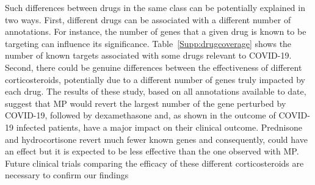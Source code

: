 \documentclass[Minh_PhD_thesis.tex]{subfiles}
\begin{document}
Such differences between drugs in the same class can be potentially explained in two ways. First, different drugs can be associated with a different number of annotations. For instance, the number of genes that a given drug is known to be targeting can influence its significance. Table~\ref{Supp:drugcoverage} shows the number of known targets associated with some drugs relevant to COVID-19. Second, there could be genuine differences between the effectiveness of different corticosteroids, potentially due to a different number of genes truly impacted by each drug. The results of these study, based on all annotations available to date, suggest that MP would revert the largest number of the gene perturbed by COVID-19, followed by dexamethasone and, as shown in the outcome of COVID-19 infected patients, have a major impact on their clinical outcome. Prednisone and hydrocortisone revert much fewer known genes and consequently, could have an effect but it is expected to be less effective than the one observed with MP.  Future clinical trials comparing the efficacy of these different corticosteroids are necessary to confirm our findings
\end{document}
